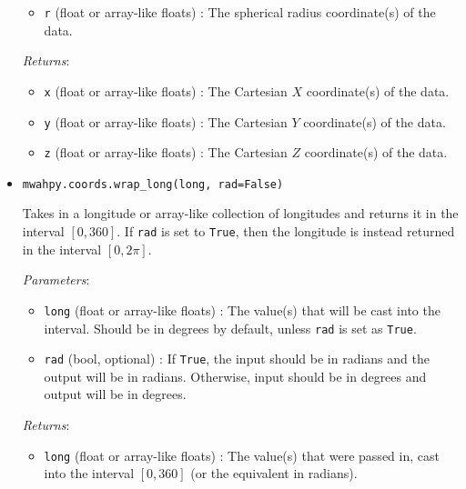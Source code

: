 \documentclass{article}
\begin{document}
\begin{itemize}
\begin{itemize}
\item \verb!r! (float or array-like floats) : The spherical radius coordinate(s) of the data.

\end{itemize}

\textit{Returns}: \begin{itemize}

\item \verb!x! (float or array-like floats) : The Cartesian $X$ coordinate(s) of the data.

\item \verb!y! (float or array-like floats) : The Cartesian $Y$ coordinate(s) of the data.

\item \verb!z! (float or array-like floats) : The Cartesian $Z$ coordinate(s) of the data.

\end{itemize}



\item \verb!mwahpy.coords.wrap_long(long, rad=False)!

Takes in a longitude or array-like collection of longitudes and returns it in the interval $[0, 360]$. If \verb!rad! is set to \verb!True!, then the longitude is instead returned in the interval $[0, 2\pi]$. 

\textit{Parameters}: \begin{itemize}

\item \verb!long! (float or array-like floats) : The value(s) that will be cast into the interval. Should be in degrees by default, unless \verb!rad! is set as \verb!True!.

\item \verb!rad! (bool, optional) : If \verb!True!, the input should be in radians and the output will be in radians. Otherwise, input should be in degrees and output will be in degrees.

\end{itemize}

\textit{Returns}: \begin{itemize}

\item \verb!long! (float or array-like floats) : The value(s) that were passed in, cast into the interval $[0,360]$ (or the equivalent in radians).

\end{itemize}




\end{itemize}
\end{document}
